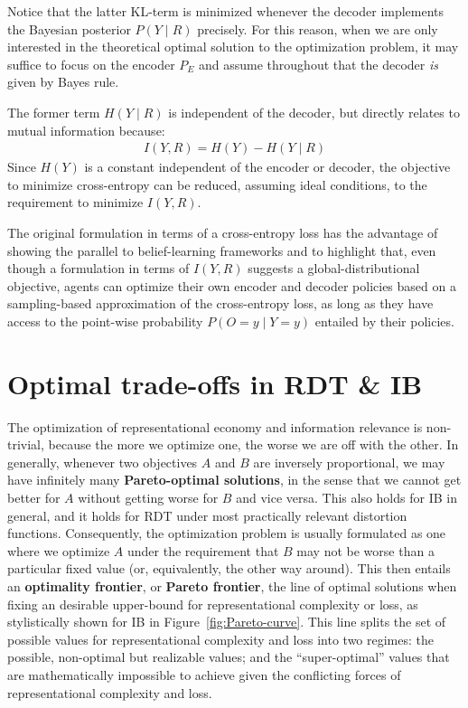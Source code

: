 \documentclass[nobib,nofonts]{tufte-handout}
\begin{document}
Notice that the latter KL-term is minimized whenever the decoder implements the Bayesian posterior $P(Y \mid R)$ precisely.
For this reason, when we are only interested in the theoretical optimal solution to the optimization problem, it may suffice to focus on the encoder $P_{E}$ and assume throughout that the decoder \textit{is} given by Bayes rule.

The former term $H(Y \mid R)$ is independent of the decoder, but directly relates to mutual information because:
\begin{align*}
  I(Y,R) = H(Y) - H(Y \mid R)
\end{align*}
Since $H(Y)$ is a constant independent of the encoder or decoder, the objective to minimize cross-entropy can be reduced, assuming ideal conditions, to the requirement to minimize $I(Y,R)$.

The original formulation in terms of a cross-entropy loss has the advantage of showing the parallel to belief-learning frameworks and to highlight that, even though a formulation in terms of $I(Y,R)$ suggests a global-distributional objective, agents can optimize their own encoder and decoder policies based on a sampling-based approximation of the cross-entropy loss, as long as they have access to the point-wise probability $P(O=y \mid Y=y)$ entailed by their policies.

\section{Optimal trade-offs in RDT \& IB}

The optimization of representational economy and information relevance is non-trivial, because the more we optimize one, the worse we are off with the other.
In generally, whenever two objectives $A$ and $B$ are inversely proportional, we may have infinitely many \textbf{Pareto-optimal solutions}, in the sense that we cannot get better for $A$ without getting worse for $B$ and vice versa.
This also holds for IB in general, and it holds for RDT under most practically relevant distortion functions.
Consequently, the optimization problem is usually formulated as one where we optimize $A$ under the requirement that $B$ may not be worse than a particular fixed value (or, equivalently, the other way around).
This then entails an \textbf{optimality frontier}, or \textbf{Pareto frontier}, the line of optimal solutions when fixing an desirable upper-bound for representational complexity or loss, as stylistically shown for IB in Figure~\ref{fig:Pareto-curve}.
This line splits the set of possible values for representational complexity and loss into two regimes: the possible, non-optimal but realizable values; and the ``super-optimal'' values that are mathematically impossible to achieve given the conflicting forces of representational complexity and loss.
\end{document}
